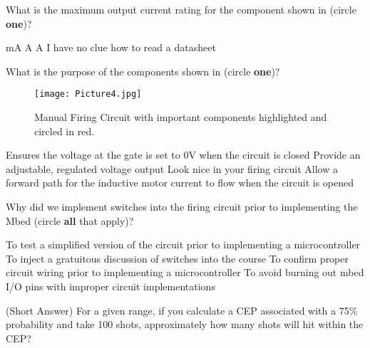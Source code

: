 \documentclass{exam}
\begin{document}
\begin{questions}
\clearpage
\question
What is the maximum output current rating for the component shown in  (circle {\bf one})?
\begin{choices}
 mA
 A
 A
\choice I have no clue how to read a datasheet
\end{choices}






\question
What is the purpose of the components shown in  (circle {\bf one})?
\begin{figure}[h]
\centering
	\texttt{[image: Picture4.jpg]}
	\caption{Manual Firing Circuit with important components highlighted and circled in red.}
	\label{fig:pulldown}
\end{figure}
\begin{choices}
\choice Ensures the voltage at the gate is set to 0V when the circuit is closed
\choice Provide an adjustable, regulated voltage output  
\choice Look nice in your firing circuit
\choice Allow a forward path for the inductive motor current to flow when the circuit is opened
\end{choices}













\question
Why did we implement switches into the firing circuit prior to implementing the Mbed (circle {\bf all} that apply)?
\begin{choices}
\choice To test a simplified version of the circuit prior to implementing a microcontroller
\choice To inject a gratuitous discussion of switches into the course
\choice To confirm proper circuit wiring prior to implementing a microcontroller
\choice To avoid burning out mbed I/O pins with improper circuit implementations
\end{choices}





\clearpage
\question
(Short Answer) For a given range, if you calculate a CEP associated with a 75\% probability and take 100 shots, approximately how many shots will hit within the CEP?






\end{questions}
\end{document}
